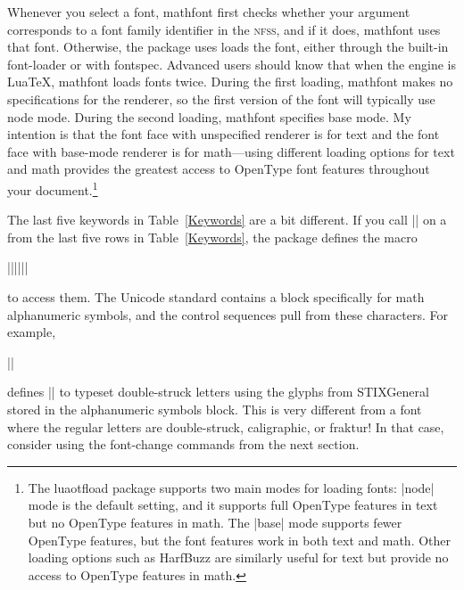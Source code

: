 \documentclass[12pt,twoside]{article}
\begin{document}
Whenever you select a font, \textsf{mathfont} first checks whether your argument corresponds to a font family identifier in the \textsc{nfss}, and if it does, \textsf{mathfont} uses that font. Otherwise, the package uses loads the font, either through the built-in font-loader or with \textsf{fontspec}. Advanced users should know that when the engine is Lua\TeX, \textsf{mathfont} loads fonts twice. During the first loading, \textsf{mathfont} makes no specifications for the renderer, so the first version of the font will typically use node mode. During the second loading, \textsf{mathfont} specifies base mode. My intention is that the font face with unspecified renderer is for text and the font face with base-mode renderer is for math---using different loading options for text and math provides the greatest access to OpenType font features throughout your document.\footnote{The \textsf{luaotfload} package supports two main modes for loading fonts: |node| mode is the default setting, and it supports full OpenType features in text but no OpenType features in math. The |base| mode supports fewer OpenType features, but the font features work in both text and math. Other loading options such as HarfBuzz are similarly useful for text but provide no access to OpenType features in math.}

The last five keywords in Table~\ref{Keywords} are a bit different. If you call |\mathfont| on a  from the last five rows in Table~\ref{Keywords}, the package defines the macro
\begin{code}
|\math||{||}|
\end{code}
to access them. The Unicode standard contains a block specifically for math alphanumeric symbols, and the control sequences pull from these characters. For example,
\begin{code}
||
\end{code}
defines |\mathbb| to typeset double-struck letters using the glyphs from STIXGeneral stored in the alphanumeric symbols block. This is very different from a font where the regular letters are double-struck, caligraphic, or fraktur! In that case, consider using the font-change commands from the next section.
\end{document}
